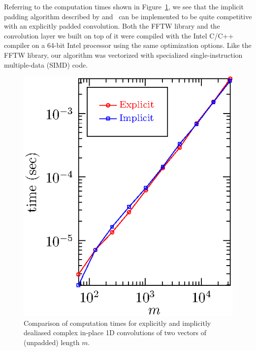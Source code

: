 \documentclass[final]{siamltex}
\begin{document}
Referring to the computation times shown in Figure~\ref{timing1c},
we see that the implicit padding algorithm described by  
and~
can be implemented to be quite competitive with an explicitly padded
convolution. Both the FFTW library and the convolution layer we built on top of it were compiled with the
Intel C/C++ compiler on a 64-bit Intel processor using the same optimization
options. Like the FFTW library, our algorithm was vectorized with
specialized single-instruction multiple-data (SIMD) code.

\begin{figure}[htbp]
\begin{center}
\begin{minipage}{0.49\linewidth}
\begin{center}
\includegraphics{timing1c}
\caption{Comparison of computation times for explicitly and implicitly
dealiased complex in-place 1D convolutions of two vectors of
(unpadded) length $m$.}
\label{timing1c}
\end{center}
\end{minipage}
%
\begin{minipage}{0.49\linewidth}
\begin{center}

\end{center}
\end{minipage}
\end{center}
\end{figure}
\end{document}

